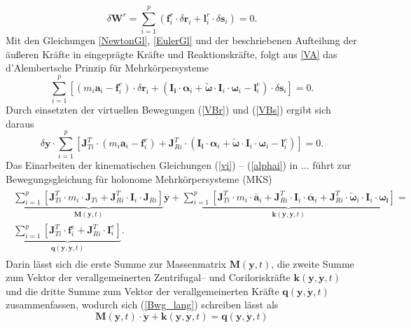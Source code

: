 \begin{equation}\label{VA}
\delta\pmb{W}^r = \sum_{i=1}^p(\pmb{f}_i^r\cdot \delta \pmb{r}_i + \pmb{l}^r_i\cdot\delta\pmb{s}_i)=0.
\end{equation}
Mit den Gleichungen \eqref{NewtonGl}, \eqref{EulerGl} und der beschriebenen Aufteilung der äußeren Kräfte in eingeprägte Kräfte und Reaktionskräfte, folgt aus \eqref{VA} das d’Alembertsche Prinzip für Mehrkörpersysteme
\begin{equation}\label{VA}
\sum_{i=1}^p\left[ (m_i\pmb{a}_i-\pmb{f}_i^e)\cdot \delta \pmb{r}_i + (\pmb{I_i}\cdot \pmb{\alpha}_i + \tilde{\pmb{\omega}}\cdot\pmb{I}_i\cdot\pmb{\omega}_i-\pmb{l}^e_i)\cdot\delta\pmb{s}_i\right] =0.
\end{equation}
Durch einsetzten der virtuellen Bewegungen (\ref{VBr}) und (\ref{VBs}) ergibt sich daraus
\begin{equation}
\delta\pmb{y}\cdot \sum_{i=1}^p\left[\pmb{J}^T_{Ti}\cdot(m_i\pmb{a}_i-\pmb{f}_i^e)+ \pmb{J}^T_{Ri}\cdot(\pmb{I_i}\cdot \pmb{\alpha}_i + \tilde{\pmb{\omega}}\cdot\pmb{I}_i\cdot\pmb{\omega}_i-\pmb{l}^e_i)\right]=0.
\end{equation}
Das Einarbeiten der kinematischen Gleichungen (\ref{vi}) -- (\ref{alphai}) in ... führt zur Bewegungsgleichung für holonome Mehrkörpersysteme (MKS) 
\begin{align}\label{Bwg_lang}
\begin{split}
\underbrace{\sum_{i=1}^p\left[\pmb{J}_{Ti}^T\cdot m_i \cdot \pmb{J}_{Ti} + \pmb{J}_{Ri}^T\cdot \pmb{I}_i \cdot \pmb{J}_{Ri}\right]}_{\pmb{M}(\pmb{y},t)}\ddot{\pmb{y}}+\underbrace{\sum_{i=1}^p\left[\pmb{J}_{Ti}^T\cdot m_i \cdot \overline{\pmb{a}}_i + \pmb{J}^T_{Ri}\cdot\pmb{I}_i\cdot\overline{\pmb{\alpha}}_i+\pmb{J}^T_{Ri}\cdot\tilde{\pmb{\omega}}_i\cdot\pmb{I}_i\cdot\pmb{\omega_i}\right]}_{\pmb{k}(\pmb{y},\dot{\pmb{y}},t)}=\\ \underbrace{\sum_{i=1}^p\left[\pmb{J}^T_{Ti}\cdot\pmb{f}_i^e + \pmb{J}_{Ri}^T\cdot\pmb{I}_i^e\right]}_{\pmb{q}(\pmb{y},\dot{\pmb{y}},t)}.
\end{split}
\end{align}
Darin lässt sich die erste Summe zur Massenmatrix $\pmb{M}(\pmb{y},t)$, die zweite Summe zum Vektor der verallgemeinerten Zentrifugal-- und Coriloriskräfte $\pmb{k}(\pmb{y},\dot{\pmb{y}},t)$ und die dritte Summe zum Vektor der verallgemeinerten Kräfte $\pmb{q}(\pmb{y},\dot{\pmb{y}},t)$ zusammenfassen, wodurch sich (\ref{Bwg_lang}) schreiben lässt als
\begin{equation}\label{Bwg}
\pmb{M}(\pmb{y},t)\cdot\ddot{\pmb{y}}+\pmb{k}(\pmb{y},\dot{\pmb{y}},t) = \pmb{q}(\pmb{y},\dot{\pmb{y}},t)
\end{equation} 
  
